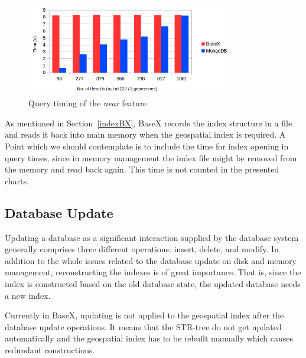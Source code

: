 \documentclass[a4paper,12pt]{article}
\begin{document}
\begin{figure}
\centering
\includegraphics[width=0.8\textwidth]{BXvsMongoNear-newColor-new.png}
\caption{Query timing of the \textit{near} feature}
\label{figBXvsMongoNear}
\end{figure}


As mentioned in Section~\ref{indexBX}, BaseX records the index structure in a file and reads it back into main memory when the geospatial index is required. A Point which we should contemplate is to include the time for index opening in query times, since in memory management the index file might be removed from the memory and read back again. This time is not counted in the presented charts.


\subsection{Database Update}
\label{update}
Updating a database as a significant interaction supplied by the database system generally comprises three different operations: insert, delete, and modify. In addition to the whole issues related to the database update on disk and memory management, reconstructing the indexes is of great importance. That is, since the index is constructed based on the old database state, the updated database needs a new index. %

Currently in BaseX, updating is not applied to the geospatial index after the database update operations. It means that the STR-tree do not get updated automatically and the geospatial index has to be rebuilt manually which causes redundant constructions. %
\end{document}
